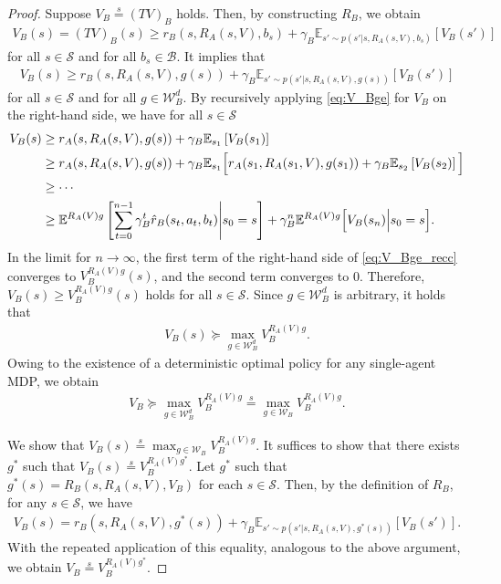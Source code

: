 \documentclass{acml}
\providecommand{\E}{\mathbb{E}} %
\providecommand{\eqs}{\stackrel{s}{=}}
\begin{document}
\begin{proof}
	Suppose $V_B \eqs (TV)_B$ holds.
	Then, by constructing $R_B$, we obtain
	\begin{align}
		V_B(s) = (TV)_B(s) \ge r_B(s,R_A(s,V),b_s)+\gamma_B\E_{s'\sim p(s'|s,R_A(s,V),b_s)}\left[V_B(s')\right]
	\end{align}
	for all $s\in\mathcal{S}$ and for all $b_s\in\mathcal{B}$.
	It implies that
	\begin{align}
		V_B(s)\ge r_B(s,R_A(s,V),g(s))+\gamma_B\E_{s'\sim p(s'|s,R_A(s,V),g(s))}\left[V_B(s')\right]\label{eq:V_Bge}
	\end{align}
	for all $s\in\mathcal{S}$ and for all $g\in\mathcal{W}_B^d$.
	By recursively applying \cref{eq:V_Bge} for $V_B$ on the right-hand side, we have for all $s\in\mathcal{S}$    \begin{subequations}\label{eq:V_Bge_subeq}
		\begin{align}
			V_B(s)&\ge r_A(s,R_A(s,V),g(s))+\gamma_B\E_{s_1}\left[V_B(s_1)\right]\\
			&\ge\begin{multlined}[t]
				r_A(s,R_A(s,V),g(s))+\gamma_B\E_{s_1}\Bigl[
				r_A(s_1,R_A(s_1,V),g(s_1))
                    +\gamma_B\E_{s_2}\left[V_B(s_2)\right]\Bigl]
			\end{multlined}\\
			&\ge \cdots\nonumber\\
			&\ge\begin{multlined}[t]
			    \E^{R_A(V)g}\left[\sum_{t=0}^{n-1}\gamma_B^t\hat{r}_B(s_t,a_t,b_t)\middle| s_0=s\right] 
                    +\gamma_B^n\E^{R_A(V)g}\Bigl[V_B(s_n)\Bigl| s_0=s\Bigl].
			\end{multlined}\label{eq:V_Bge_recc}
		\end{align}
	\end{subequations}
	In the limit for $n\to\infty$, the first term of the right-hand side of \cref{eq:V_Bge_recc} converges to $V_B^{R_A(V)g}(s)$, and the second term converges to 0. 
	Therefore, $V_B(s)\ge V_B^{R_A(V)g}(s)$ holds for all $s\in\mathcal{S}$.
	Since $g\in\mathcal{W}_B^d$ is arbitrary, it holds that
	\begin{align}
		V_B(s)\succcurlyeq\max_{g\in\mathcal{W}_B^d}V_B^{R_A(V)g}.
	\end{align}
	Owing to the existence of a deterministic optimal policy for any single-agent MDP, we obtain
	\begin{align}
		V_B \succcurlyeq\max_{g\in\mathcal{W}_B^d}V_B^{R_A(V)g}\eqs\max_{g\in\mathcal{W}_B}V_B^{R_A(V)g}.
	\end{align}
	
	We show that $V_B(s)\eqs \max_{g\in\mathcal{W}_B}V_B^{R_A(V)g}$.
	It suffices to show that there exists $g^*$ such that $V_B(s)\eqs V_B^{R_A(V)g^*}$.
	Let $g^*$ such that $g^*(s) = R_B(s,R_A(s,V),V_B)$ for each $s \in \mathcal{S}$. 
	Then, by the definition of $R_B$, for any $s \in \mathcal{S}$, we have
	\begin{align}
		V_B(s) = r_B(s,R_A(s,V),g^*(s))+\gamma_B\E_{s'\sim p(s'|s,R_A(s,V),g^*(s))}\left[V_B(s')\right].
	\end{align}
	With the repeated application of this equality, analogous to the above argument, we obtain $V_B \eqs V_B^{R_A(V)g^*}$.
\end{proof}
\end{document}
